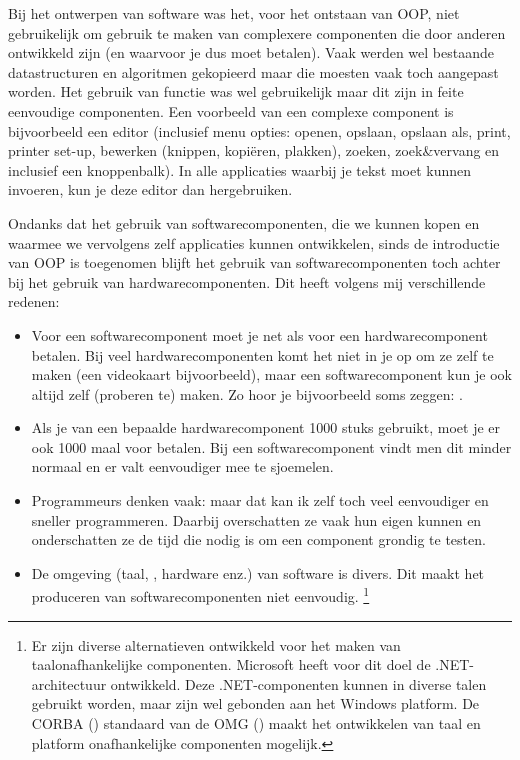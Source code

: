 \begin{cpplstShortInline}
Bij het ontwerpen van software was het, voor het ontstaan van OOP, niet gebruikelijk om gebruik te maken van complexere componenten die door anderen ontwikkeld zijn (en waarvoor je dus moet betalen).
Vaak werden wel bestaande datastructuren en algoritmen gekopieerd maar die moesten vaak toch aangepast worden.
Het gebruik van functie  was wel gebruikelijk maar dit zijn in feite eenvoudige componenten.
Een voorbeeld van een complexe component is bijvoorbeeld een editor (inclusief menu opties: openen, opslaan, opslaan als, print, printer set-up, bewerken (knippen, kopiëren, plakken), zoeken, zoek\&vervang en inclusief een knoppenbalk).
In alle applicaties waarbij je tekst moet kunnen invoeren, kun je deze editor dan hergebruiken.

Ondanks dat het gebruik van softwarecomponenten, die we kunnen kopen en waarmee we vervolgens zelf applicaties kunnen ontwikkelen, sinds de introductie van OOP is toegenomen blijft het gebruik van softwarecomponenten toch achter bij het gebruik van hardwarecomponenten.
Dit heeft volgens mij verschillende redenen:
\begin{itemize}
    \item Voor een softwarecomponent moet je net als voor een hardwarecomponent betalen. Bij veel hardwarecomponenten komt het niet in je op om ze zelf te maken (een videokaart bijvoorbeeld), maar een softwarecomponent kun je ook altijd zelf (proberen te) maken.
Zo hoor je bijvoorbeeld soms zeggen: .
    \item Als je van een bepaalde hardwarecomponent 1000 stuks gebruikt, moet je er ook 1000 maal voor betalen.
Bij een softwarecomponent vindt men dit minder normaal en er valt eenvoudiger mee te sjoemelen.
    \item Programmeurs denken vaak: maar dat kan ik zelf toch veel eenvoudiger en sneller programmeren. Daarbij overschatten ze vaak hun eigen kunnen en onderschatten ze de tijd die nodig is om een component grondig te testen.
    \item De omgeving (taal, , hardware enz.) van software is divers.
Dit maakt het produceren van softwarecomponenten niet eenvoudig.
%
\footnote{%
    Er zijn diverse alternatieven ontwikkeld voor het maken van taalonafhankelijke componenten.
Microsoft heeft voor dit doel de .NET-architectuur ontwikkeld.
    Deze .NET-componenten kunnen in diverse talen gebruikt worden, maar zijn wel gebonden aan het Windows platform.
    De CORBA () standaard van de OMG () maakt het ontwikkelen van taal en platform onafhankelijke componenten mogelijk.
}
\end{itemize}


\end{cpplstShortInline}
